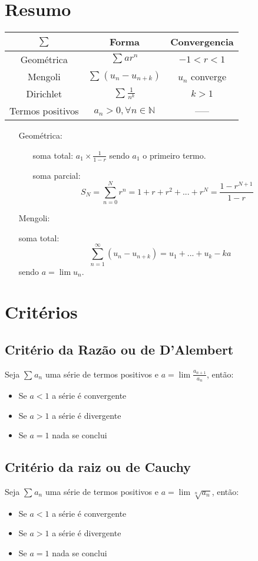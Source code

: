 \documentclass[10pt,a4paper]{report}
\begin{document}
\section{Resumo}
\begin{table}[h]
\centering
\begin{tabular}{c|c|c}
$\sum$ & Forma & Convergencia\\ \hline
Geométrica & $\sum_{}^{} ar^{n}$ & $-1 < r < 1$\\ \hline
Mengoli & $\sum_{}^{} (u_n - u_{n+k})$ & $u_n$ converge\\ \hline
Dirichlet & $\sum_{}^{} \frac{1}{n^k}$ & $k > 1$\\ \hline
Termos positivos & $a_n > 0, \forall n \in \mathbb{N}$ & -----
\end{tabular}
\end{table}
\begin{itemize}
\item[Geométrica:]
\item[] 
\begin{itemize}
\item[soma total:]
$
a_1 \times \frac{1}{1-r}
$
sendo $a_1$ o primeiro termo.
\item[soma parcial:]
$$
S_N = \sum_{n=0}^{N} r^{n} = 1 + r + r^2 + ... + r^N = \frac{1-r^{N+1}}{1-r}
$$
\end{itemize}
\item[Mengoli:]
\item[] soma total:
$$
\sum_{n=1}^{\infty} (u_n - u_{n+k}) = u_1 + ... + u_k - ka
$$
sendo $a = \lim u_n$.
\end{itemize}

\section{Critérios}
\subsection{Critério da Razão ou de D’Alembert}
Seja $\sum_{}^{} a_n$ uma série de termos positivos e $a = \lim \frac{a_{n+1}}{a_n}$, então:
\begin{itemize}
\item Se $a < 1$ a série é convergente
\item Se $a > 1$ a série é divergente
\item Se $a = 1$ nada se conclui
\end{itemize}
\subsection{Critério da raiz ou de Cauchy}
Seja $\sum_{}^{} a_n$ uma série de termos positivos e $a = \lim \sqrt[n]{a_n}$, então:
\begin{itemize}
\item Se $a < 1$ a série é convergente
\item Se $a > 1$ a série é divergente
\item Se $a = 1$ nada se conclui
\end{itemize}
\end{document}
